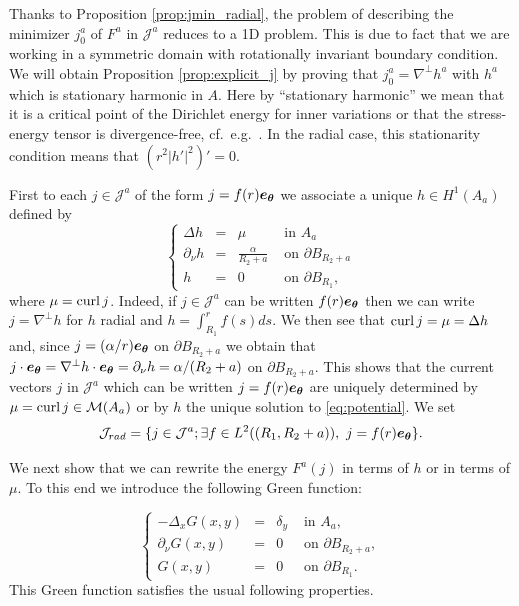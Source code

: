 \documentclass[12pt,reqno]{amsart}
\renewcommand{\vec}[1]{\text{\boldmath $#1$}}
\def\curl{{\rm curl\,}}
\def \p {\partial}
\def \J {{\mathcal J}}
\numberwithin{equation}{section}
\begin{document}
Thanks to Proposition \ref{prop:jmin_radial}, the problem of describing the minimizer \(j_0^a\) of \(F^a\) in \(\J^a\) reduces to a 1D problem. This is due to fact that we are working in a  symmetric domain with rotationally invariant boundary condition. We will obtain Proposition \ref{prop:explicit_j} by proving  that \(j_0^a=\nabla^\perp h^a\) with \(h^a\) which is stationary harmonic in \(A\). Here by ``stationary harmonic'' we mean that it is a critical point of the Dirichlet energy for inner variations or that the stress-energy tensor is divergence-free, cf.\ e.g.\ \cite[Theorem 1.4.15]{Helein_2002}. In the radial case, this stationarity condition means that \((r^2|h'|^2)'=0\).

First to each \(j\in \J^a\) of the form \(j=f(r)\vec{e_\theta}\) we associate a unique \(h\in H^1(A_a)\) defined  by
\begin{equation}\label{eq:potential}
\left\{
\begin{array}{rcll}
\Delta h&=&\mu & \text{ in } A_a \\
\p_\nu h&=& \frac{\alpha}{R_2+a} & \text{ on } \p B_{R_2+a} \\
h&=&0  & \text{ on } \p B_{R_1},
\end{array}
\right.
\end{equation}
 where \(\mu=\curl j\). Indeed, if \(j\in \J^a\) can be written \(f(r)\vec{e_\theta}\) then we can write \(j=\nabla^\perp h\) for \(h\) radial and \(h=\int_{R_1}^r f(s) ds\). We then see that \( \curl j=\mu=\Delta h\) and, since \(j=(\alpha/r) \vec{e_\theta}\) on \(\p B_{R_2+a}\) we obtain that \(j\cdot \vec{e_\theta}=\nabla^\perp h\cdot \vec{e_\theta}=\p_\nu h=\alpha/(R_2+a)\) on \( \p B_{R_2+a}\). This shows that the current vectors \(j\) in \(\J^a\) which can be written \(j=f(r)\vec{e_\theta}\) are uniquely determined by \(\mu= \curl j\in \mathcal{M}(A_a)\) or by \(h\) the unique solution to \eqref{eq:potential}. We set
\begin{equation}\label{eq:Irad}
 \J_{rad}= \{j\in \J^a; \exists f\in L^2( (R_1,R_2+a)), \ j=f(r) \vec{e_\theta}\}.
 \end{equation}

 We next show that we can rewrite the energy \(F^a(j)\) in terms of \(h\) or in terms of \(\mu\). To this end we introduce the following Green function:


\begin{equation}\label{eq:Green}
\left\{
\begin{array}{rcll}
-\Delta_x G(x,y) &=& \delta_y & \text{ in } A_a, \\
\p_{\nu} G(x,y)& =& 0 & \text{ on } \p B_{R_2+a}, \\
G(x,y)& =& 0  & \text{ on } \p B_{R_1}.
\end{array}
\right.
\end{equation}
 This Green function satisfies the usual following properties.
\end{document}
